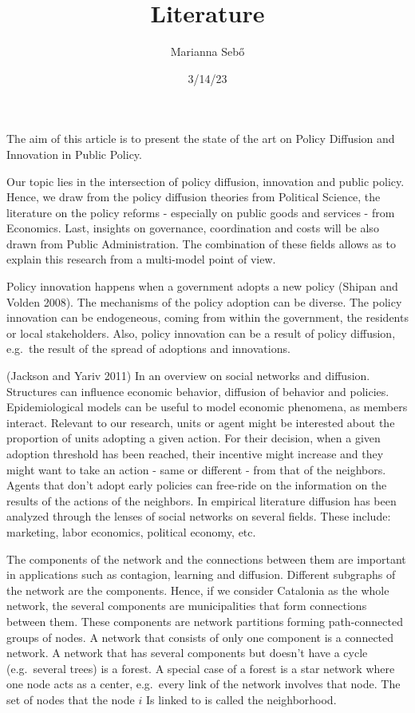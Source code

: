 \documentclass[
  letterpaper,
  DIV=11,
  numbers=noendperiod]{scrartcl}
\title{Literature}
\author{Marianna Sebő}
\date{3/14/23}
\renewcommand*\contentsname{Table of contents}
\newcommand\contentsname{Table of contents}
\begin{document}
\maketitle
\ifdefined\Shaded\renewenvironment{Shaded}{\begin{tcolorbox}[borderline west={3pt}{0pt}{shadecolor}, boxrule=0pt, breakable, frame hidden, sharp corners, enhanced, interior hidden]}{\end{tcolorbox}}\fi

\renewcommand*\contentsname{Table of contents}
{
\hypersetup{linkcolor=}
\setcounter{tocdepth}{3}
\tableofcontents
}
The aim of this article is to present the state of the art on Policy
Diffusion and Innovation in Public Policy.

Our topic lies in the intersection of policy diffusion, innovation and
public policy. Hence, we draw from the policy diffusion theories from
Political Science, the literature on the policy reforms - especially on
public goods and services - from Economics. Last, insights on
governance, coordination and costs will be also drawn from Public
Administration. The combination of these fields allows as to explain
this research from a multi-model point of view.

Policy innovation happens when a government adopts a new policy (Shipan
and Volden 2008). The mechanisms of the policy adoption can be diverse.
The policy innovation can be endogeneous, coming from within the
government, the residents or local stakeholders. Also, policy innovation
can be a result of policy diffusion, e.g.~the result of the spread of
adoptions and innovations.

(Jackson and Yariv 2011) In an overview on social networks and
diffusion. Structures can influence economic behavior, diffusion of
behavior and policies. Epidemiological models can be useful to model
economic phenomena, as members interact. Relevant to our research, units
or agent might be interested about the proportion of units adopting a
given action. For their decision, when a given adoption threshold has
been reached, their incentive might increase and they might want to take
an action - same or different - from that of the neighbors. Agents that
don't adopt early policies can free-ride on the information on the
results of the actions of the neighbors. In empirical literature
diffusion has been analyzed through the lenses of social networks on
several fields. These include: marketing, labor economics, political
economy, etc.

The components of the network and the connections between them are
important in applications such as contagion, learning and diffusion.
Different subgraphs of the network are the components. Hence, if we
consider Catalonia as the whole network, the several components are
municipalities that form connections between them. These components are
network partitions forming path-connected groups of nodes. A network
that consists of only one component is a connected network. A network
that has several components but doesn't have a cycle (e.g.~several
trees) is a forest. A special case of a forest is a star network where
one node acts as a center, e.g.~every link of the network involves that
node. The set of nodes that the node \(i\) Is linked to is called the
neighborhood.
\end{document}
